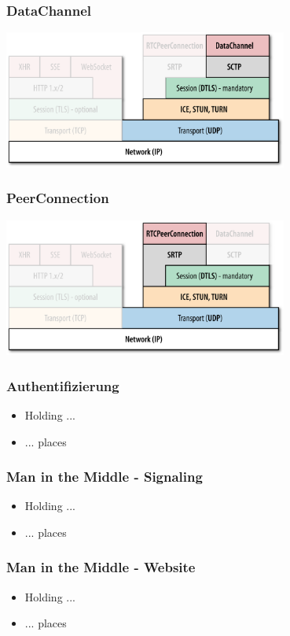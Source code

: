 \documentclass[12pt]{beamer}
\begin{document}
\begin{frame}
  \frametitle{DataChannel}
  \centerline{\includegraphics[width=0.7\textwidth]{img/stack_oreilly_datachannels.png}}
\end{frame}

\begin{frame}
  \frametitle{PeerConnection}
  \centerline{\includegraphics[width=0.7\textwidth]{img/stack_oreilly_pc.png}}
\end{frame}

\begin{frame}
  \frametitle{Authentifizierung}
  \begin{itemize}
    \item Holding ...
    \item ... places
  \end{itemize}
\end{frame}

\begin{frame}
  \frametitle{Man in the Middle - Signaling}
  \begin{itemize}
    \item Holding ...
    \item ... places
  \end{itemize}
\end{frame}

\begin{frame}
  \frametitle{Man in the Middle - Website}
  \begin{itemize}
    \item Holding ...
    \item ... places
  \end{itemize}
\end{frame}
\end{document}
